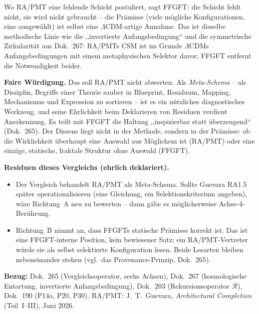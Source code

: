 \noindent Wo RA/PMT eine fehlende Schicht postuliert, sagt FFGFT: die
Schicht fehlt nicht, sie wird nicht gebraucht -- die Prämisse (viele
mögliche Konfigurationen, eine ausgewählt) ist selbst eine
$\Lambda$CDM-artige Annahme. Das ist dieselbe methodische Linie wie die
,,invertierte Anfangsbedingung`` und die symmetrische Zirkularität aus
Dok.~267: RA/PMTs CSM ist im Grunde $\Lambda$CDMs Anfangsbedingungen
mit einem metaphysischen Selektor davor; FFGFT entfernt die
Notwendigkeit beider.

\textbf{Faire Würdigung.} Das soll RA/PMT nicht abwerten. Als
\emph{Meta-Schema} -- als Disziplin, Begriffe einer Theorie sauber in
Blueprint, Residuum, Mapping, Mechanismus und Expression zu sortieren --
ist es ein nützliches diagnostisches Werkzeug, und seine Ehrlichkeit
beim Deklarieren von Residuen verdient Anerkennung. Es teilt mit FFGFT
die Haltung ,,inspizierbar statt überzeugend`` (Dok.~265). Der Dissens
liegt nicht in der Methode, sondern in der Prämisse: ob die Wirklichkeit
überhaupt eine Auswahl aus Möglichem ist (RA/PMT) oder eine einzige,
statische, fraktale Struktur ohne Auswahl (FFGFT).

\textbf{Residuen dieses Vergleichs (ehrlich deklariert).}
\begin{itemize}
  \item Der Vergleich behandelt RA/PMT als Meta-Schema. Sollte Guevara
        RA1.5 später operationalisieren (eine Gleichung, ein
        Selektionskriterium angeben), wäre Richtung~A neu zu bewerten --
        dann gäbe es möglicherweise Achse-4-Berührung.
  \item Richtung~B nimmt an, dass FFGFTs statische Prämisse korrekt ist.
        Das ist eine FFGFT-interne Position, kein bewiesener Satz; ein
        RA/PMT-Vertreter würde sie als selbst selektierte Konfiguration
        lesen. Beide Lesarten bleiben nebeneinander stehen (vgl.\ das
        Provenance-Prinzip, Dok.~265).
\end{itemize}

\noindent\textbf{Bezug:} Dok.~265 (Vergleichsoperator, sechs Achsen),
Dok.~267 (kosmologische Entartung, invertierte Anfangsbedingung),
Dok.~203 (Rekursionsoperator $\mathcal{R}$), Dok.~190 (P14a, P20, P30).
RA/PMT: J.~T.~Guevara, \emph{Architectural Completion} (Teil~I--III),
Juni 2026.
